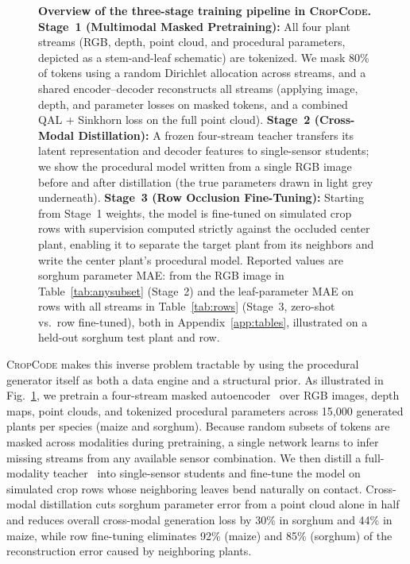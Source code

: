 \documentclass[10pt,twocolumn,letterpaper]{article}
\newcommand{\method}{\textsc{CropCode}}
\begin{document}
\begin{figure}[t]
  \centering
  \resizebox{\linewidth}{!}{}
  \caption{\textbf{Overview of the three-stage training pipeline in \method{}.} \textbf{Stage~1 (Multimodal Masked Pretraining):} All four plant streams (RGB, depth, point cloud, and procedural parameters, depicted as a stem-and-leaf schematic) are tokenized. We mask 80\% of tokens using a random Dirichlet allocation across streams, and a shared encoder--decoder reconstructs all streams (applying image, depth, and parameter losses on masked tokens, and a combined QAL + Sinkhorn loss on the full point cloud). \textbf{Stage~2 (Cross-Modal Distillation):} A frozen four-stream teacher transfers its latent representation and decoder features to single-sensor students; we show the procedural model written from a single RGB image before and after distillation (the true parameters drawn in light grey underneath). \textbf{Stage~3 (Row Occlusion Fine-Tuning):} Starting from Stage~1 weights, the model is fine-tuned on simulated crop rows with supervision computed strictly against the occluded center plant, enabling it to separate the target plant from its neighbors and write the center plant's procedural model. Reported values are sorghum parameter MAE: from the RGB image in Table~\ref{tab:anysubset} (Stage~2) and the leaf-parameter MAE on rows with all streams in Table~\ref{tab:rows} (Stage~3, zero-shot vs.\ row fine-tuned), both in Appendix~\ref{app:tables}, illustrated on a held-out sorghum test plant and row.}
  \label{fig:arch}
\end{figure}

\method{} makes this inverse problem tractable by using the procedural generator itself as both a data engine and a structural prior. As illustrated in Fig.~\ref{fig:arch}, we pretrain a four-stream masked autoencoder~\citep{he2022mae,bachmann2022multimae,mizrahi2023fourm,dong2025embodiedmae} over RGB images, depth maps, point clouds, and tokenized procedural parameters across 15{,}000 generated plants per species (maize and sorghum). Because random subsets of tokens are masked across modalities during pretraining, a single network learns to infer missing streams from any available sensor combination. We then distill a full-modality teacher~\citep{hinton2015distillation} into single-sensor students and fine-tune the model on simulated crop rows whose neighboring leaves bend naturally on contact. Cross-modal distillation cuts sorghum parameter error from a point cloud alone in half and reduces overall cross-modal generation loss by 30\% in sorghum and 44\% in maize, while row fine-tuning eliminates 92\% (maize) and 85\% (sorghum) of the reconstruction error caused by neighboring plants.
\end{document}
